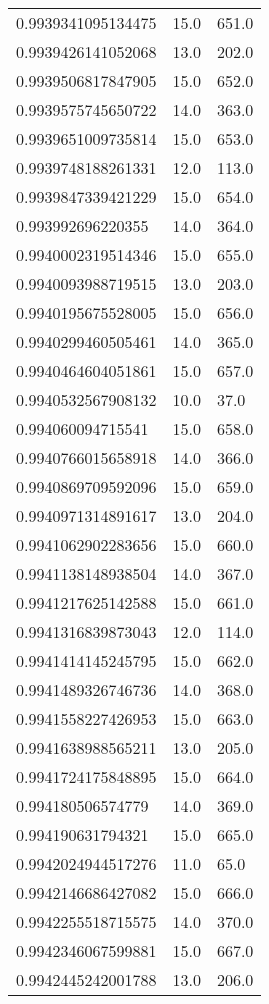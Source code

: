 \begin{center}
\begin{supertabular}[H]{p{0.30\textwidth}p{0.05\textwidth}p{0.05\textwidth}}
0.9939341095134475 & 15.0 & 651.0 \\ 
0.9939426141052068 & 13.0 & 202.0 \\ 
0.9939506817847905 & 15.0 & 652.0 \\ 
0.9939575745650722 & 14.0 & 363.0 \\ 
0.9939651009735814 & 15.0 & 653.0 \\ 
0.9939748188261331 & 12.0 & 113.0 \\ 
0.9939847339421229 & 15.0 & 654.0 \\ 
0.993992696220355 & 14.0 & 364.0 \\ 
0.9940002319514346 & 15.0 & 655.0 \\ 
0.9940093988719515 & 13.0 & 203.0 \\ 
0.9940195675528005 & 15.0 & 656.0 \\ 
0.9940299460505461 & 14.0 & 365.0 \\ 
0.9940464604051861 & 15.0 & 657.0 \\ 
0.9940532567908132 & 10.0 & 37.0 \\ 
0.994060094715541 & 15.0 & 658.0 \\ 
0.9940766015658918 & 14.0 & 366.0 \\ 
0.9940869709592096 & 15.0 & 659.0 \\ 
0.9940971314891617 & 13.0 & 204.0 \\ 
0.9941062902283656 & 15.0 & 660.0 \\ 
0.9941138148938504 & 14.0 & 367.0 \\ 
0.9941217625142588 & 15.0 & 661.0 \\ 
0.9941316839873043 & 12.0 & 114.0 \\ 
0.9941414145245795 & 15.0 & 662.0 \\ 
0.9941489326746736 & 14.0 & 368.0 \\ 
0.9941558227426953 & 15.0 & 663.0 \\ 
0.9941638988565211 & 13.0 & 205.0 \\ 
0.9941724175848895 & 15.0 & 664.0 \\ 
0.994180506574779 & 14.0 & 369.0 \\ 
0.994190631794321 & 15.0 & 665.0 \\ 
0.9942024944517276 & 11.0 & 65.0 \\ 
0.9942146686427082 & 15.0 & 666.0 \\ 
0.9942255518715575 & 14.0 & 370.0 \\ 
0.9942346067599881 & 15.0 & 667.0 \\ 
0.9942445242001788 & 13.0 & 206.0 \\ 

\end{supertabular}
\end{center}
